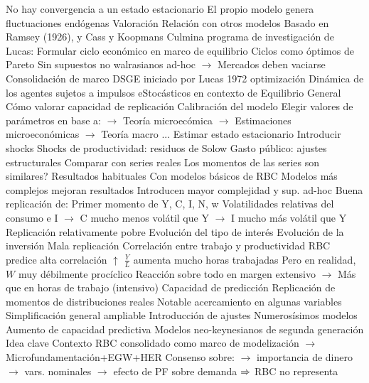 \documentclass{nuevotema}
\begin{document}
\begin{esquemal}
				\4[] No hay convergencia a un estado estacionario
				\4[] El propio modelo genera fluctuaciones endógenas
		\2 Valoración
			\3 Relación con otros modelos
				\4 Basado en Ramsey (1926), y Cass y Koopmans
				\4 Culmina programa de investigación de Lucas:
				\4[] Formular ciclo económico en marco de equilibrio
				\4[] Ciclos como óptimos de Pareto
				\4[] Sin supuestos no walrasianos ad-hoc
				\4[] $\to$ Mercados deben vaciarse
				\4 Consolidación de marco DSGE
				\4[] iniciado por Lucas 1972
				\4[] optimización Dinámica de los agentes
				\4[] sujetos a impulsos eStocásticos
				\4[] en contexto de Equilibrio General
			\3 Cómo valorar capacidad de replicación
				\4[1] Calibración del modelo
				\4[] Elegir valores de parámetros en base a:
				\4[] $\to$ Teoría microecómica
				\4[] $\to$ Estimaciones microeconómicas
				\4[] $\to$ Teoría macro
				\4[] ...
				\4[2] Estimar estado estacionario
				\4[3] Introducir shocks
				\4[] Shocks de productividad: residuos de Solow
				\4[] Gasto público: ajustes estructurales
				\4[4] Comparar con series reales
				\4[] Los momentos de las series son similares?
			\3 Resultados habituales
				\4 Con modelos básicos de RBC
				\4[] Modelos más complejos mejoran resultados
				\4[] Introducen mayor complejidad y sup. ad-hoc
				\4 Buena replicación de:
				\4[] Primer momento de Y, C, I, N, w
				\4[] Volatilidades relativas del consumo e I
				\4[] $\to$ C mucho menos volátil que Y
				\4[] $\to$ I mucho más volátil que Y
				\4 Replicación relativamente pobre
				\4[] Evolución del tipo de interés
				\4[] Evolución de la inversión
				\4 Mala replicación
				\4[] Correlación entre trabajo y productividad
				\4[] RBC predice alta correlación
				\4[] $\uparrow$ $\frac{Y}{L}$ aumenta mucho horas trabajadas
				\4[] Pero en realidad, $W$ muy débilmente procíclico
				\4[] Reacción sobre todo en margen extensivo
				\4[] $\to$ Más que en horas de trabajo (intensivo)
			\3 Capacidad de predicción
				\4 Replicación de momentos de distribuciones reales
				\4[] Notable acercamiento en algunas variables
			\3 Simplificación general ampliable
				\4 Introducción de ajustes
				\4[] Numerosísimos modelos
				\4 Aumento de capacidad predictiva
	\1 
		\2 Modelos neo-keynesianos de segunda generación
			\3 Idea clave
				\4 Contexto
				\4[] RBC consolidado como marco de modelización
				\4[] $\to$ Microfundamentación+EGW+HER
				\4[] Consenso sobre:
				\4[] $\to$ importancia de dinero
				\4[] $\to$ vars. nominales
				\4[] $\to$ efecto de PF sobre demanda
				\4[] $\Rightarrow$ RBC no representa

\end{esquemal}
\end{document}

